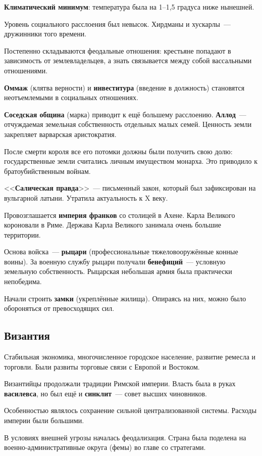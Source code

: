 \documentclass[a4paper, 12pt]{article}
\begin{document}
\textbf{Климатический минимум}: температура была на 1--1,5 градуса ниже
нынешней.

Уровень социального расслоения был невысок. Хирдманы и хускарлы~---
дружинники того времени.

Постепенно складываются феодальные отношения: крестьяне попадают в
зависимость от землевладельцев, а знать связывается между собой
вассальными отношениями.

\textbf{Оммаж} (клятва верности) и \textbf{инвеститура} (введение в
должность) становятся неотъемлемыми в социальных отношениях.

\textbf{Соседская община} (марка) приводит к ещё большему расслоению.
\textbf{Аллод}~--- отчуждаемая земельная собственность отдельных малых семей.
Ценность земли закрепляет варварская аристократия.

После смерти короля все его потомки должны были получить свою долю:
государственные земли считались личным имуществом монарха. Это приводило
к братоубийственным войнам.

<<\textbf{Салическая правда}>>~--- письменный закон, который был
зафиксирован на вульгарной латыни. Утратила актуальность к X веку.

Провозглашается \textbf{империя франков} со столицей в Ахене. Карла Великого
короновали в Риме. Держава Карла Великого занимала очень большие территории.

Основа войска~--- \textbf{рыцари} (профессиональные тяжеловооружённые конные
воины). За военную службу рыцари получали \textbf{бенефиций}~--- условную
земельную собственность. Рыцарская небольшая армия была практически
непобедима.

Начали строить \textbf{замки} (укреплённые жилища). Опираясь на них, можно
было обороняться от превосходящих сил.

\subsection{Византия}
Стабильная экономика, многочисленное городское население, развитие ремесла
и торговли. Были развиты торговые связи с Европой и Востоком.

Византийцы продолжали традиции Римской империи. Власть была в руках
\textbf{василевса}, но был ещё и \textbf{синклит}~--- совет высших чиновников.

Особенностью являлось сохранение сильной централизованной системы. Расходы
империи были большими.

В условиях внешней угрозы началась феодализация. Страна была поделена на
военно-административные округа (фемы) во главе со стратегами.
\end{document}
